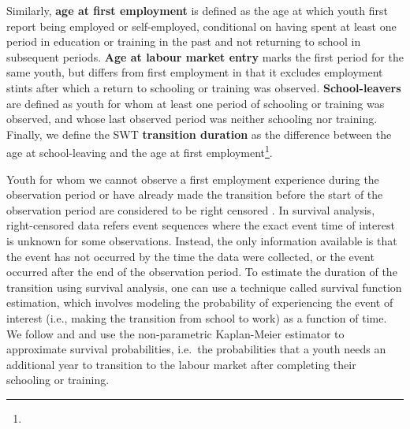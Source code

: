 \documentclass[
  a4paper, twoside, 12pt]{book}
\newcommand{\hlc}[2][color]{}
\begin{document}
Similarly, \textbf{age at first employment} is defined as the age at which youth first report being employed or self-employed, conditional on having spent at least one period in education or training in the past and not returning to school in subsequent periods. \textbf{Age at labour market entry} marks the first period for the same youth, but differs from first employment in that it excludes employment stints after which a return to schooling or training was observed. \textbf{School-leavers} are defined as youth for whom at least one period of schooling or training was observed, and whose last observed period was neither schooling nor training. Finally, we define the SWT \textbf{transition duration} as the difference between the age at school-leaving and the age at first employment\footnote{\hlc[pink]{Both cross-sectional and longitudinal data have been used to quantify the school-to-work transition in the literature. Cross-sectional data can be used to estimate the transition duration by subtracting the age at which 50 percent of  the  population  has  left  school  from  the  age  at  which  50  percent  of  the  population  has  found work. Quintini, J. P. Martin, and S. Martin (2007) and Quintini and S.Martin (2014) use this approach to report transition duration in advanced economies, along with mean school-leaving and first employment ages. For longitudinal studies,  the  mean  transition  duration,  reported  for  example  in  Quintini, J. P. Martin, and S. Martin (2007),  the  non-inclusion of youth still in transition will bias results.}}.

Youth for whom we cannot observe a first employment experience during the observation period or have already made the transition before the start of the observation period are considered to be right censored \autocite{nilsson2019}. In survival analysis, right-censored data refers event sequences where the exact event time of interest is unknown for some observations. Instead, the only information available is that the event has not occurred by the time the data were collected, or the event occurred after the end of the observation period. To estimate the duration of the transition using survival analysis, one can use a technique called survival function estimation, which involves modeling the probability of experiencing the event of interest (i.e., making the transition from school to work) as a function of time. We follow \textcite{nordman2015} and \textcite{manacorda2017} and use the non-parametric Kaplan-Meier estimator to approximate survival probabilities, i.e.~the probabilities that a youth needs an additional year to transition to the labour market after completing their schooling or training. 
\end{document}
